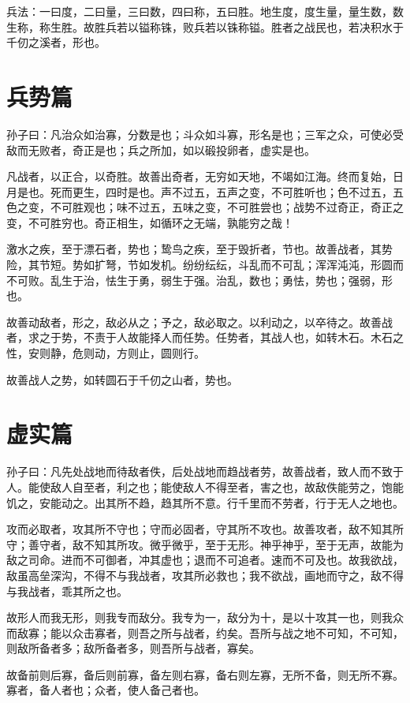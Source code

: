 \documentclass[UTF8]{ctexart}
\begin{document}
	兵法：一曰度，二曰量，三曰数，四曰称，五曰胜。地生度，度生量，量生数，数生称，称生胜。故胜兵若以镒称铢，败兵若以铢称镒。胜者之战民也，若决积水于千仞之溪者，形也。
	
	\newpage
	\section{兵势篇}
	
	孙子曰：凡治众如治寡，分数是也；斗众如斗寡，形名是也；三军之众，可使必受敌而无败者，奇正是也；兵之所加，如以碫投卵者，虚实是也。
	
	凡战者，以正合，以奇胜。故善出奇者，无穷如天地，不竭如江海。终而复始，日月是也。死而更生，四时是也。声不过五，五声之变，不可胜听也；色不过五，五色之变，不可胜观也；味不过五，五味之变，不可胜尝也；战势不过奇正，奇正之变，不可胜穷也。奇正相生，如循环之无端，孰能穷之哉！
	
	激水之疾，至于漂石者，势也；鸷鸟之疾，至于毁折者，节也。故善战者，其势险，其节短。势如扩弩，节如发机。纷纷纭纭，斗乱而不可乱；浑浑沌沌，形圆而不可败。乱生于治，怯生于勇，弱生于强。治乱，数也；勇怯，势也；强弱，形也。
	
	故善动敌者，形之，敌必从之；予之，敌必取之。以利动之，以卒待之。故善战者，求之于势，不责于人故能择人而任势。任势者，其战人也，如转木石。木石之性，安则静，危则动，方则止，圆则行。
	
	故善战人之势，如转圆石于千仞之山者，势也。
	
	\newpage
	\section{虚实篇}
	
	孙子曰：凡先处战地而待敌者佚，后处战地而趋战者劳，故善战者，致人而不致于人。能使敌人自至者，利之也；能使敌人不得至者，害之也，故敌佚能劳之，饱能饥之，安能动之。出其所不趋，趋其所不意。行千里而不劳者，行于无人之地也。
	
	攻而必取者，攻其所不守也；守而必固者，守其所不攻也。故善攻者，敌不知其所守；善守者，敌不知其所攻。微乎微乎，至于无形。神乎神乎，至于无声，故能为敌之司命。进而不可御者，冲其虚也；退而不可追者。速而不可及也。故我欲战，敌虽高垒深沟，不得不与我战者，攻其所必救也；我不欲战，画地而守之，敌不得与我战者，乖其所之也。
	
	故形人而我无形，则我专而敌分。我专为一，敌分为十，是以十攻其一也，则我众而敌寡；能以众击寡者，则吾之所与战者，约矣。吾所与战之地不可知，不可知，则敌所备者多；敌所备者多，则吾所与战者，寡矣。
	
	故备前则后寡，备后则前寡，备左则右寡，备右则左寡，无所不备，则无所不寡。寡者，备人者也；众者，使人备己者也。
	
\end{document}
